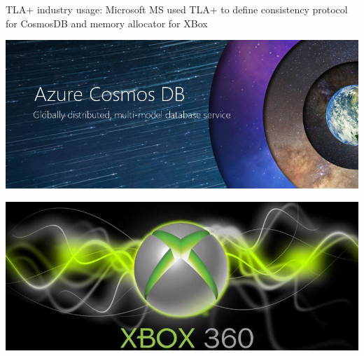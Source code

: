 \documentclass[12pt]{beamer}
\begin{document}
  \begin{frame}{TLA+ industry usage: Microsoft}
      MS used TLA+ to define consistency protocol for CosmosDB and memory
      allocator for XBox~\cite{ms2017}
    \begin{center}
        \includegraphics[scale=0.2]{figures/cosmos}
    \end{center}
    \begin{center}
        \includegraphics[scale=0.2]{figures/xbox}
    \end{center}
  \end{frame}
\end{document}
